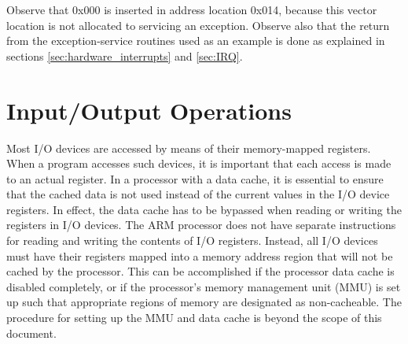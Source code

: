\documentclass[11pt, twoside, pdftex]{article}
\newcommand{\commonPath}{../../Common}
\begin{document}
Observe that 0x000 is inserted in address location 0x014,
because this vector location is not allocated to servicing an
exception. Observe also that the return from the
exception-service routines used as an example is done as
explained in sections \ref{sec:hardware_interrupts} and \ref{sec:IRQ}.

\section{Input/Output Operations}

Most I/O devices are accessed by means of their memory-mapped
registers. When a program accesses such devices, it is important
that each access is made to an actual register. In a
processor with a data cache, it is essential to ensure that the cached data is not used instead of the current values in the I/O device registers. In effect, the data cache has to be bypassed
when reading or writing the registers in I/O devices.
The ARM processor does not have separate instructions for reading
and writing the contents of I/O registers. Instead, all I/O
devices must have their registers mapped into a memory address
region that will not be cached by the processor. This can be accomplished if
the processor data cache is disabled completely, or if the processor's memory management
unit (MMU) is set up such that appropriate regions of memory are designated as non-cacheable. The 
procedure for setting up the MMU and data cache is beyond the scope of this document.



\end{document}
